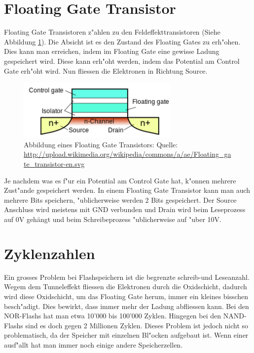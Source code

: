 \begin{refsection}
\section{Floating Gate Transistor}
Floating Gate Transistoren z"ahlen zu den Feldeffekttransistoren
(Siehe Abbildung \ref{skript:Floatinggatetransistor}). Die Absicht ist
es den Zustand des Floating Gates zu erh"ohen. Dies kann man erreichen,
indem im Floating Gate eine gewisse Ladung gespeichert wird. Diese kann
erh"oht werden, indem das Potential am Control Gate erh"oht wird. Nun
fliessen die Elektronen in Richtung Source.

\begin{figure}
\centering
\includegraphics[width=0.7\textwidth]{flash/graphics/Floatinggate.png}
\caption{Abbildung eines Floating Gate Transistors: Quelle:
\url{http://upload.wikimedia.org/wikipedia/commons/a/ae/Floating_gate_transistor-en.svg}
\label{skript:Floatinggatetransistor}}
\end{figure}

Je nachdem was es f"ur ein Potential am Control Gate hat, k"onnen mehrere
Zust"ande gespeichert werden. In einem Floating Gate Transistor kann
man auch mehrere Bits speichern, "ublicherweise werden 2 Bits gespeichert.
Der Source Anschluss wird meistens mit GND verbunden und Drain wird beim
Leseprozess auf 0V gehängt und beim Schreibeprozess "ublicherweise auf
"uber 10V.


\section{Zyklenzahlen}
Ein grosses Problem bei Flashspeichern ist die begrenzte schreib-und
Leseanzahl. Wegem dem Tunneleffekt fliessen die Elektronen durch die
Oxidschicht, dadurch wird diese Oxidschicht, um das Floating Gate herum,
immer ein kleines bisschen besch"adigt. Dies bewirkt, dass immer mehr
der Ladung abfliessen kann. Bei den NOR-Flashs hat man etwa 10'000
bis 100'000 Zyklen. Hingegen bei den NAND-Flashs sind es doch gegen 2
Millionen Zyklen. Dieses Problem ist jedoch nicht so problematisch, da
der Speicher mit einzelnen Bl"ocken aufgebaut ist. Wenn einer ausf"allt
hat man immer noch einige andere Speicherzellen.



\end{refsection}
